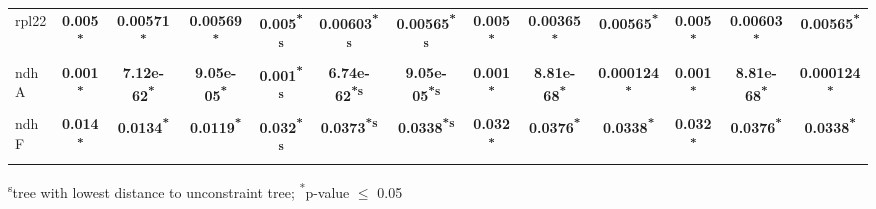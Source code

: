 \documentclass[a4paper]{article}
\begin{document}
\begin{longtable}{l|c|c|c|c|c|c|c|c|c|c|c|c}
rpl22&\textbf{0.005\textsuperscript{*}}&\textbf{0.00571\textsuperscript{*}}&\textbf{0.00569\textsuperscript{*}}&\textbf{0.005\textsuperscript{*}\textsuperscript{s}}&\textbf{0.00603\textsuperscript{*}\textsuperscript{s}}&\textbf{0.00565\textsuperscript{*}\textsuperscript{s}}&\textbf{0.005\textsuperscript{*}}&\textbf{0.00365\textsuperscript{*}}&\textbf{0.00565\textsuperscript{*}}&\textbf{0.005\textsuperscript{*}}&\textbf{0.00603\textsuperscript{*}}&\textbf{0.00565\textsuperscript{*}}\\
ndhA&\textbf{0.001\textsuperscript{*}}&\textbf{7.12e-62\textsuperscript{*}}&\textbf{9.05e-05\textsuperscript{*}}&\textbf{0.001\textsuperscript{*}\textsuperscript{s}}&\textbf{6.74e-62\textsuperscript{*}\textsuperscript{s}}&\textbf{9.05e-05\textsuperscript{*}\textsuperscript{s}}&\textbf{0.001\textsuperscript{*}}&\textbf{8.81e-68\textsuperscript{*}}&\textbf{0.000124\textsuperscript{*}}&\textbf{0.001\textsuperscript{*}}&\textbf{8.81e-68\textsuperscript{*}}&\textbf{0.000124\textsuperscript{*}}\\
ndhF&\textbf{0.014\textsuperscript{*}}&\textbf{0.0134\textsuperscript{*}}&\textbf{0.0119\textsuperscript{*}}&\textbf{0.032\textsuperscript{*}\textsuperscript{s}}&\textbf{0.0373\textsuperscript{*}\textsuperscript{s}}&\textbf{0.0338\textsuperscript{*}\textsuperscript{s}}&\textbf{0.032\textsuperscript{*}}&\textbf{0.0376\textsuperscript{*}}&\textbf{0.0338\textsuperscript{*}}&\textbf{0.032\textsuperscript{*}}&\textbf{0.0376\textsuperscript{*}}&\textbf{0.0338\textsuperscript{*}}\\
\end{longtable}
\textsuperscript{s}tree with lowest distance to unconstraint tree; \textsuperscript{*}p-value $\leq$ 0.05
\end{document}

